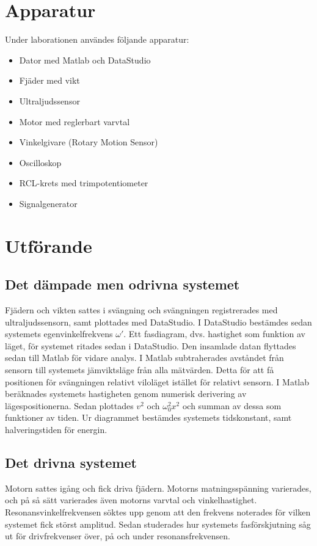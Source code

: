 \documentclass[a4paper,10pt]{article}
\begin{document}
\pagebreak
\section{Apparatur}
Under laborationen användes följande apparatur:
\begin{itemize}
	\item Dator med Matlab och DataStudio
	\item Fjäder med vikt
	\item Ultraljudssensor
	\item Motor med reglerbart varvtal
	\item Vinkelgivare (Rotary Motion Sensor)
	\item Oscilloskop
	\item RCL-krets med trimpotentiometer
	\item Signalgenerator
\end{itemize}

\section{Utförande}
\subsection{Det dämpade men odrivna systemet}
Fjädern och vikten sattes i svängning och svängningen registrerades med ultraljudssensorn, samt plottades med DataStudio. I DataStudio bestämdes sedan systemets egenvinkelfrekvens $\omega'$. Ett fasdiagram, dvs. hastighet som funktion av läget, för systemet ritades sedan i DataStudio. Den insamlade datan flyttades sedan till Matlab för vidare analys. I Matlab subtraherades avståndet från sensorn till systemets jämviktsläge från alla mätvärden. Detta för att få positionen för svängningen relativt viloläget istället för relativt sensorn. I Matlab beräknades systemets hastigheten genom numerisk derivering av lägespositionerna. Sedan plottades $v^2$ och $\omega_0^2x^2$ och summan av dessa som funktioner av tiden. Ur diagrammet bestämdes systemets tidskonstant, samt halveringstiden för energin.

\subsection{Det drivna systemet}
Motorn sattes igång och fick driva fjädern. Motorns matningsspänning varierades, och på så sätt varierades även motorns varvtal och vinkelhastighet. Resonansvinkelfrekvensen söktes upp genom att den frekvens noterades för vilken systemet fick störst amplitud. Sedan studerades hur systemets fasförskjutning såg ut för drivfrekvenser över, på och under resonansfrekvensen.
\end{document}

